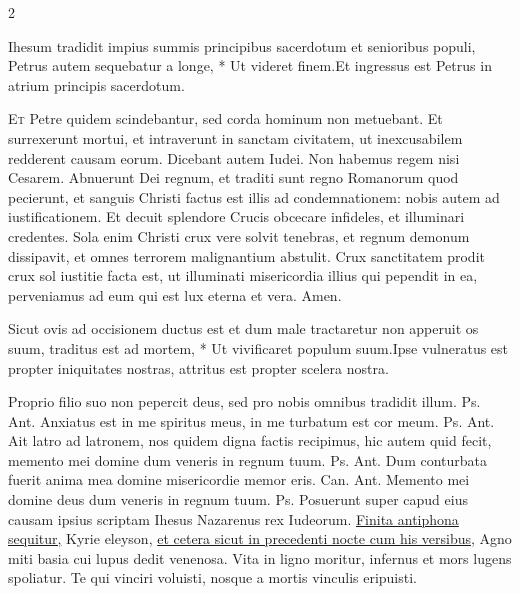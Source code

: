 \begin{multicols*}{2}
\begin{responsory}
{Ihesum tradidit impius summis principibus sacerdotum et senioribus populi, Petrus autem sequebatur a longe, * Ut videret finem.}{Et ingressus est Petrus in atrium principis sacerdotum.}
\end{responsory}%
\lettrine[lines=2]{\zallmancaps \color{Blue} E}{t} Petre quidem scindebantur, sed corda hominum non metuebant. Et surrexerunt mortui, et intraverunt in sanctam civitatem, ut inexcusabilem redderent causam eorum. Dicebant autem Iudei. Non habemus regem nisi Cesarem. Abnuerunt Dei regnum, et traditi sunt regno Romanorum quod pecierunt, et sanguis Christi factus est illis ad condemnationem: nobis autem ad iustificationem. Et decuit splendore Crucis obcecare infideles, et illuminari credentes. Sola enim Christi crux vere solvit tenebras, et regnum demonum dissipavit, et omnes terrorem malignantium abstulit. Crux sanctitatem prodit crux sol iustitie facta est, ut illuminati misericordia illius qui pependit in ea, perveniamus ad eum qui est lux eterna et vera. Amen.
\begin{responsory}
{Sicut ovis ad occisionem ductus est et dum male tractaretur non apperuit os suum, traditus est ad mortem, * Ut vivificaret populum suum.}{Ipse vulneratus est propter iniquitates nostras, attritus est propter scelera nostra.}
\end{responsory}%
 Proprio filio suo non pepercit deus, sed pro nobis omnibus tradidit illum. {\color{Red} Ps.}  {\color{Red} Ant.} Anxiatus est in me spiritus meus, in me turbatum est cor meum. {\color{Red} Ps.}  {\color{Red} Ant.} Ait latro ad latronem, nos quidem digna factis recipimus, hic autem quid fecit, memento mei domine dum veneris in regnum tuum. {\color{Red} Ps.}  {\color{Red} Ant.} Dum conturbata fuerit anima mea domine misericordie memor eris. {\color{Red} Can.}  {\color{Red} Ant.} Memento mei domine deus dum veneris in regnum tuum. {\color{Red} Ps.} 
 Posuerunt super capud eius causam ipsius scriptam Ihesus Nazarenus rex Iudeorum.
\newline \ul{Finita antiphona sequitur,} Kyrie eleyson, \ul{et cetera sicut in precedenti nocte cum his versibus,} \V Agno miti basia cui lupus dedit venenosa. \V Vita in ligno moritur, infernus et mors lugens spoliatur. \V Te qui vinciri voluisti, nosque a mortis vinculis eripuisti.

\end{multicols*}
